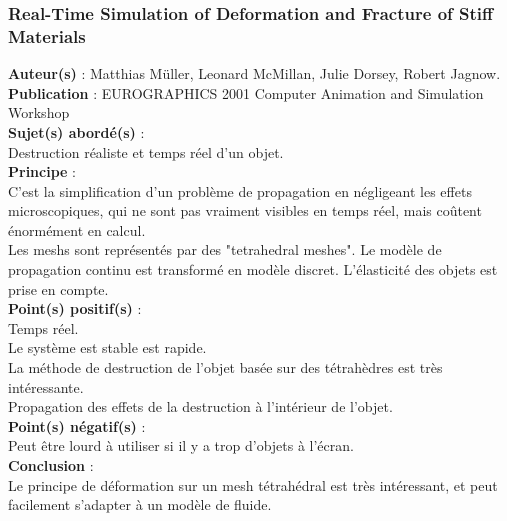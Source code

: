 \documentclass[a4paper,10pt]{article}
\begin{document}
\subsubsection{Real-Time Simulation of Deformation and Fracture of Stiff Materials}
\textbf{Auteur(s)} : Matthias Müller, Leonard McMillan, Julie Dorsey, Robert Jagnow.\\
\textbf{Publication} : EUROGRAPHICS 2001 Computer Animation and Simulation Workshop \\
\textbf{Sujet(s) abordé(s)} : \\
	Destruction réaliste et temps réel d'un objet. \\
\textbf{Principe} :\\	
	C'est la simplification d'un problème de propagation en négligeant les effets microscopiques, qui ne sont pas vraiment visibles en temps réel, mais coûtent énormément en calcul.\\
	Les meshs sont représentés par des "tetrahedral meshes". Le modèle de propagation continu est transformé en modèle discret. L'élasticité des objets est prise en compte.\\
\textbf{Point(s) positif(s)} :\\
	Temps réel.\\
	Le système est stable est rapide.\\
	La méthode de destruction de l'objet basée sur des tétrahèdres est très intéressante.\\
	Propagation des effets de la destruction à l'intérieur de l'objet.\\
\textbf{Point(s) négatif(s)} :\\
	Peut être lourd à utiliser si il y a trop d'objets à l'écran.\\
\textbf{Conclusion} :\\
	Le principe de déformation sur un mesh tétrahédral est très intéressant, et peut facilement s'adapter à un modèle de fluide.
\end{document}
